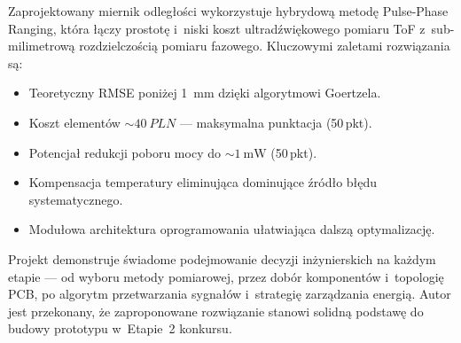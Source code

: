\documentclass[a4paper,11pt]{article}
\begin{document}
Zaprojektowany miernik odległości wykorzystuje hybrydową metodę Pulse-Phase
Ranging, która łączy prostotę i~niski koszt ultradźwiękowego pomiaru ToF
z~sub-milimetrową rozdzielczością pomiaru fazowego. Kluczowymi zaletami
rozwiązania są:

\begin{itemize}[nosep]
    \item Teoretyczny RMSE poniżej \SI{1}{\milli\metre} dzięki algorytmowi Goertzela.
    \item Koszt elementów ${\sim}\SI{40}{PLN}$ --- maksymalna punktacja (50\,pkt).
    \item Potencjał redukcji poboru mocy do ${\sim}\SI{1}{\milli\watt}$ (50\,pkt).
    \item Kompensacja temperatury eliminująca dominujące źródło błędu systematycznego.
    \item Modułowa architektura oprogramowania ułatwiająca dalszą optymalizację.
\end{itemize}

Projekt demonstruje świadome podejmowanie decyzji inżynierskich na każdym
etapie --- od wyboru metody pomiarowej, przez dobór komponentów i~topologię
PCB, po algorytm przetwarzania sygnałów i~strategię zarządzania energią.
Autor jest przekonany, że zaproponowane rozwiązanie stanowi solidną podstawę
do budowy prototypu w~Etapie~2 konkursu.
\end{document}
